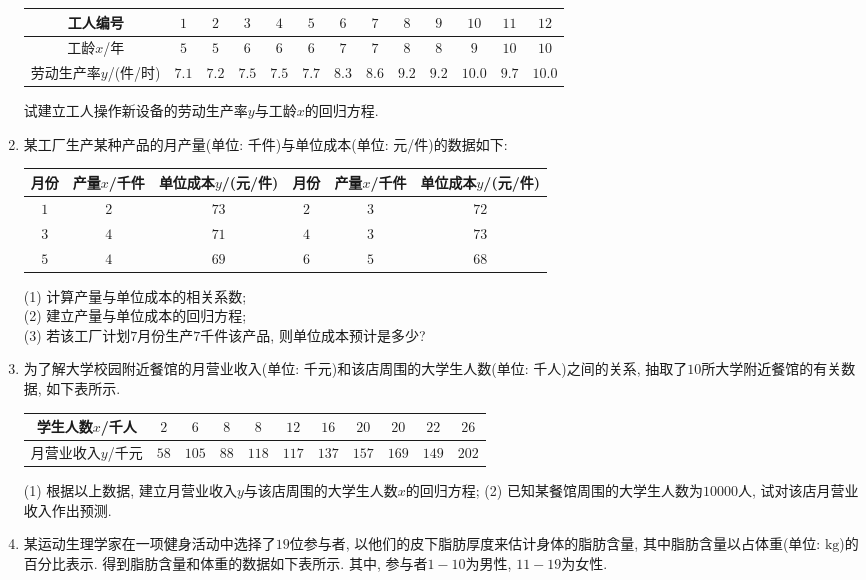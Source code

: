 \documentclass[10pt,a4paper]{article}
\begin{document}
\begin{enumerate}[1.]
\begin{center}
\begin{tabular}{|c|c|c|c|c|c|c|c|c|c|c|c|c|}
\hline
工人编号 & $1$ & $2$ & $3$ & $4$ & $5$ & $6$ & $7$ & $8$ & $9$ & $10$ & $11$ & $12$ \\ \hline
工龄$x$/年 & $5$ & $5$ & $6$ & $6$ & $6$ & $7$ & $7$ & $8$ & $8$ & $9$ & $10$ & $10$ \\ \hline
劳动生产率$y$/(件/时) & $7.1$ & $7.2$ & $7.5$ & $7.5$ & $7.7$ & $8.3$ & $8.6$ & $9.2$ & $9.2$ & $10.0$ & $9.7$ & $10.0$ \\ \hline
\end{tabular}
\end{center}
试建立工人操作新设备的劳动生产率$y$与工龄$x$的回归方程.
\item 某工厂生产某种产品的月产量(单位: 千件)与单位成本(单位: 元/件)的数据如下:
\begin{center}
\begin{tabular}{|c|c|c|c|c|c|}
\hline
月份 & 产量$x$/千件 & 单位成本$y$/(元/件) & 月份 & 产量$x$/千件 & 单位成本$y$/(元/件) \\ \hline
$1$ & $2$ & $73$ & $2$ & $3$ & $72$ \\ \hline
$3$ & $4$ & $71$ & $4$ & $3$ & $73$ \\ \hline
$5$ & $4$ & $69$ & $6$ & $5$ & $68$ \\ \hline
\end{tabular}
\end{center}
(1) 计算产量与单位成本的相关系数;\\
(2) 建立产量与单位成本的回归方程;\\
(3) 若该工厂计划$7$月份生产$7$千件该产品, 则单位成本预计是多少?
\item 为了解大学校园附近餐馆的月营业收入(单位: 千元)和该店周围的大学生人数(单位: 千人)之间的关系, 抽取了$10$所大学附近餐馆的有关数据, 如下表所示.
\begin{center}
\begin{tabular}{|c|c|c|c|c|c|c|c|c|c|c|}
\hline
学生人数$x$/千人 & $2$ & $6$ & $8$ & $8$ & $12$ & $16$ & $20$ & $20$ & $22$ & $26$ \\ \hline
月营业收入$y$/千元 & $58$ & $105$ & $88$ & $118$ & $117$ & $137$ & $157$ & $169$ & $149$ & $202$ \\ \hline
\end{tabular}
\end{center}
(1) 根据以上数据, 建立月营业收入$y$与该店周围的大学生人数$x$的回归方程;
(2) 已知某餐馆周围的大学生人数为$10000$人, 试对该店月营业收入作出预测.
\item 某运动生理学家在一项健身活动中选择了$19$位参与者, 以他们的皮下脂肪厚度来估计身体的脂肪含量, 其中脂肪含量以占体重(单位: $\text{kg}$)的百分比表示. 得到脂肪含量和体重的数据如下表所示. 其中, 参与者$1-10$为男性, $11-19$为女性.

\end{enumerate}
\end{document}
